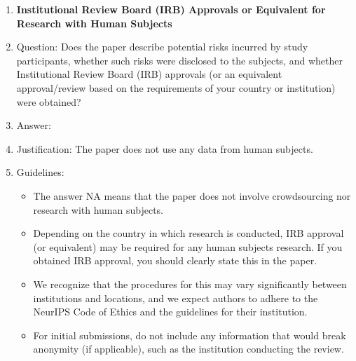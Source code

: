 \documentclass{article} %
\newcounter{ct}
\theoremstyle{definition}
\theoremstyle{remark}
\begin{document}
\begin{enumerate}
\item {\bf Institutional Review Board (IRB) Approvals or Equivalent for Research with Human Subjects}
    \item[] Question: Does the paper describe potential risks incurred by study participants, whether such risks were disclosed to the subjects, and whether Institutional Review Board (IRB) approvals (or an equivalent approval/review based on the requirements of your country or institution) were obtained?
    \item[] Answer:  \answerNA{} %
    \item[] Justification: The paper does not use any data from human subjects.
    \item[] Guidelines:
    \begin{itemize}
        \item The answer NA means that the paper does not involve crowdsourcing nor research with human subjects.
        \item Depending on the country in which research is conducted, IRB approval (or equivalent) may be required for any human subjects research. If you obtained IRB approval, you should clearly state this in the paper.
        \item We recognize that the procedures for this may vary significantly between institutions and locations, and we expect authors to adhere to the NeurIPS Code of Ethics and the guidelines for their institution.
        \item For initial submissions, do not include any information that would break anonymity (if applicable), such as the institution conducting the review.
    \end{itemize}

\end{enumerate}
\fi
\end{document}
